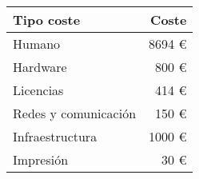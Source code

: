 \begin{longtable}[]{@{}lr@{}}
\toprule
\begin{minipage}[b]{0.38\columnwidth}\raggedright\strut
\textbf{Tipo coste}\strut
\end{minipage} & \begin{minipage}[b]{0.20\columnwidth}\raggedright\strut
\textbf{Coste}\strut
\end{minipage}\tabularnewline
\midrule
\endhead

\begin{minipage}[t]{0.38\columnwidth}\raggedright\strut
Humano\strut
\end{minipage} & \begin{minipage}[t]{0.20\columnwidth}\raggedright\strut
8694 \euro{}\strut
\end{minipage}\tabularnewline

\begin{minipage}[t]{0.38\columnwidth}\raggedright\strut
Hardware\strut
\end{minipage} & \begin{minipage}[t]{0.20\columnwidth}\raggedright\strut
800 \euro{}\strut
\end{minipage}\tabularnewline

\begin{minipage}[t]{0.38\columnwidth}\raggedright\strut
Licencias\strut
\end{minipage} & \begin{minipage}[t]{0.20\columnwidth}\raggedright\strut
414 \euro{}\strut
\end{minipage}\tabularnewline

\begin{minipage}[t]{0.38\columnwidth}\raggedright\strut
Redes y comunicación\strut
\end{minipage} & \begin{minipage}[t]{0.20\columnwidth}\raggedright\strut
150 \euro{}\strut
\end{minipage}\tabularnewline

\begin{minipage}[t]{0.38\columnwidth}\raggedright\strut
Infraestructura\strut
\end{minipage} & \begin{minipage}[t]{0.20\columnwidth}\raggedright\strut
1000 \euro{}\strut
\end{minipage}\tabularnewline

\begin{minipage}[t]{0.38\columnwidth}\raggedright\strut
Impresión\strut
\end{minipage} & \begin{minipage}[t]{0.20\columnwidth}\raggedright\strut
30 \euro{}\strut
\end{minipage}\tabularnewline


\end{longtable}
